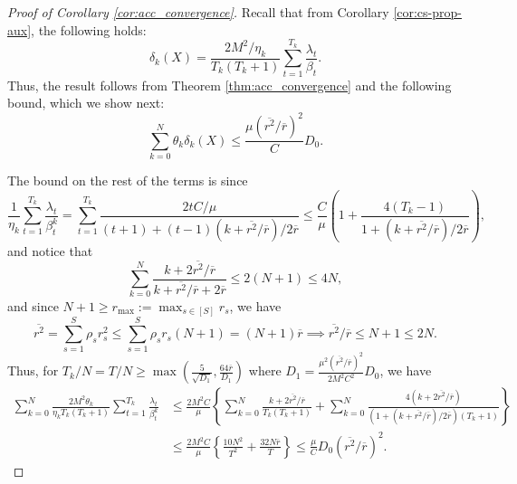 \documentclass[10pt]{article}
\begin{document}
\begin{proof}[Proof of Corollary \ref{cor:acc_convergence}]
Recall that from Corollary \ref{cor:cs-prop-aux}, the following holds:
\begin{equation*}
\delta_k(X) = \frac{2M^2/\eta_k}{T_k(T_k+1)}\sum_{t=1}^{T_k} \frac{\lambda_t}{\beta_t}.
\end{equation*}
Thus, the result follows from Theorem \ref{thm:acc_convergence} and the following bound, which we show next:
\begin{equation*}
    \sum_{k=0}^N\theta_k \delta_k(X)\leq \frac{\mu (\overline{r^2}/\overline{r})^2}{C}D_0 .
\end{equation*}

The bound on the rest of the terms is since
\begin{displaymath}
    \frac{1}{\eta_k}\sum_{t=1}^{T_k} \frac{\lambda_t}{\beta_t^k} = \sum_{t=1}^{T_k} \frac{2tC/\mu}{(t+1) + (t-1)(k+\overline{r^2}/\overline{r})/2\overline{r}}\leq \frac{C}{\mu}(1+\frac{4(T_k-1)}{1+(k+\overline{r^2}/\overline{r})/2\overline{r}}),
\end{displaymath}
and notice that
\begin{displaymath}
    \sum_{k=0}^N \frac{k+2\overline{r^2}/\overline{r}}{k+\overline{r^2}/\overline{r}+2\overline{r}} \leq 2(N+1)\leq 4N,
\end{displaymath}
and since $N+1 \geq r_{\max}:=\max_{s\in [S]} r_s$, we have
\begin{displaymath}
    \overline{r^2} = \sum_{s=1}^S \rho_s r_s^2\leq \sum_{s=1}^S \rho_s r_s (N+1) = (N+1)\overline{r}\implies \overline{r^2}/\overline{r}\leq N+1\leq 2N.
\end{displaymath}
Thus, for $T_k/N = T/N\geq \max(\frac{5}{\sqrt{D_1}},\frac{64\overline{r}}{D_1})$ where $D_1 = \frac{\mu^2(\overline{r^2}/\overline{r})^2}{2M^2C^2}D_0$, we have
\begin{align*}
     \sum_{k=0}^N \frac{2M^2\theta_k}{\eta_kT_k(T_k+1)}\sum_{t=1}^{T_k}\frac{\lambda_t}{\beta_t^k} &\leq \frac{2M^2C}{\mu}\left\{\sum_{k=0}^N\frac{k+2\overline{r^2}/\overline{r}}{T_k(T_k+1)}+\sum_{k=0}^N \frac{4(k+2\overline{r^2}/\overline{r})}{(1+(k+\overline{r^2}/\overline{r})/2\overline{r})(T_k+1)}\right\}\\
     &\leq \frac{2M^2C}{\mu}\left\{\frac{10N^2}{T^2}+\frac{32N\overline{r}}{T}\right\}\leq \frac{\mu }{C}D_0(\overline{r^2}/\overline{r})^2. 
\end{align*}



\end{proof}
\end{document}
